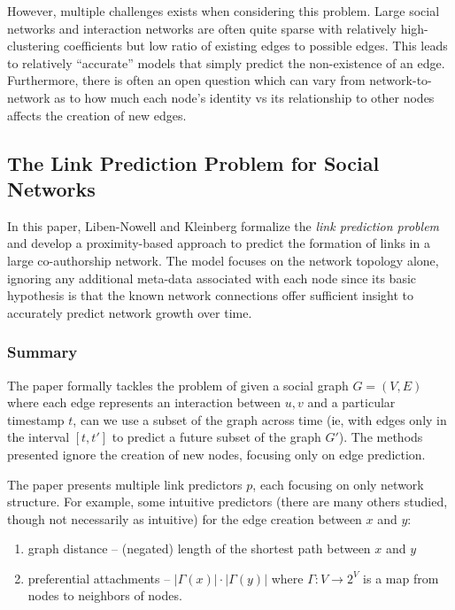 \documentclass[letterpaper, 11 pt, conference]{ieeeconf}  %
\begin{document}
However, multiple challenges exists when considering this problem. Large social networks and interaction networks are often quite sparse with relatively high-clustering coefficients but low ratio of existing edges to possible edges. This leads to relatively ``accurate'' models that simply predict the non-existence of an edge. Furthermore, there is often an open question which can vary from network-to-network as to how much each node's identity vs its relationship to other nodes affects the creation of new edges.


\subsection{The Link Prediction Problem for Social Networks}
In this paper, Liben-Nowell and Kleinberg \cite{TheLinkPredictionProblemForSocialNetworks} formalize the \textit{link prediction problem} and develop a proximity-based approach to predict the formation of links in a large co-authorship network. The model focuses on the network topology alone, ignoring any additional meta-data associated with each node since its basic hypothesis is that the known network connections offer sufficient insight to accurately predict network growth over time.

\subsubsection{Summary}
The paper formally tackles the problem of given a social graph $G = (V,E)$ where each edge represents an interaction between $u,v$ and a particular timestamp $t$, can we use a subset of the graph across time (ie, with edges only in the interval $[t,t']$ to predict a future subset of the graph $G'$). The methods presented ignore the creation of new nodes, focusing only on edge prediction.

The paper presents multiple link predictors $p$, each focusing on only network structure. For example, some intuitive predictors (there are many others studied, though not necessarily as intuitive) for the edge creation between $x$ and $y$:

\begin{enumerate}
\item graph distance -- (negated) length of the shortest path between $x$ and $y$
\item preferential attachments -- $|\Gamma(x)| \cdot |\Gamma(y)|$ where $\Gamma: V \to 2^V$ is a map from nodes to neighbors of nodes.
\end{enumerate}
\end{document}
